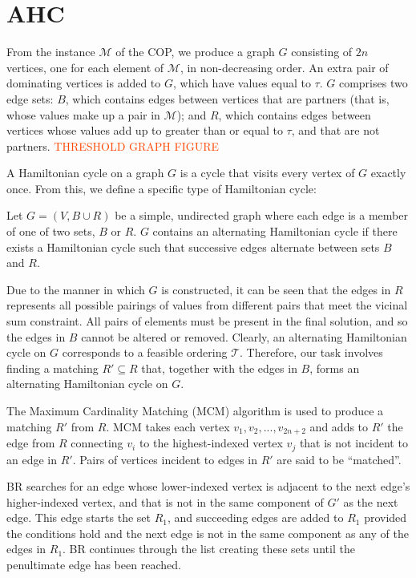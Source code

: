 \documentclass{elsarticle}
\begin{document}
\section{AHC}
\label{sec:ahc}
From the instance $\mathcal{M}$ of the COP, we produce a graph $G$ consisting of $2n$ vertices, one for each element of $\mathcal{M}$, in non-decreasing order. An extra pair of dominating vertices is added to $G$, which have values equal to $\tau$. $G$ comprises two edge sets: $B$, which contains edges between vertices that are partners (that is, whose values make up a pair in $\mathcal{M}$); and $R$, which contains edges between vertices whose values add up to greater than or equal to $\tau$, and that are not partners. \textcolor{OrangeRed}{THRESHOLD GRAPH FIGURE}

A Hamiltonian cycle on a graph $G$ is a cycle that visits every vertex of $G$ exactly once. From this, we define a specific type of Hamiltonian cycle:

\begin{definition}
	\label{defn:althamcycle}
	Let $G = (V, B \cup R)$ be a simple, undirected graph where each edge is a member of one of two sets, $B$ or $R$. $G$ contains an alternating Hamiltonian cycle if there exists a Hamiltonian cycle such that successive edges alternate between sets $B$ and $R$.
\end{definition}

Due to the manner in which $G$ is constructed, it can be seen that the edges in $R$ represents all possible pairings of values from different pairs that meet the vicinal sum constraint. All pairs of elements must be present in the final solution, and so the edges in $B$ cannot be altered or removed. Clearly, an alternating Hamiltonian cycle on $G$ corresponds to a feasible ordering $\mathcal{T}$. Therefore, our task involves finding a matching $R' \subseteq R$ that, together with the edges in $B$, forms an alternating Hamiltonian cycle on $G$.

The Maximum Cardinality Matching (MCM) algorithm is used to produce a matching $R'$ from $R$. MCM takes each vertex $v_1, v_2,...,v_{2n+2}$ and adds to $R'$ the edge from $R$ connecting $v_i$ to the highest-indexed vertex $v_j$ that is not incident to an edge in $R'$. Pairs of vertices incident to edges in $R'$ are said to be ``matched''.

BR searches for an edge whose lower-indexed vertex is adjacent to the next edge's higher-indexed vertex, and that is not in the same component of $G'$ as the next edge. This edge starts the set $R_1$, and succeeding edges are added to $R_1$ provided the conditions hold and the next edge is not in the same component as any of the edges in $R_1$. BR continues through the list creating these sets until the penultimate edge has been reached. 
\end{document}
